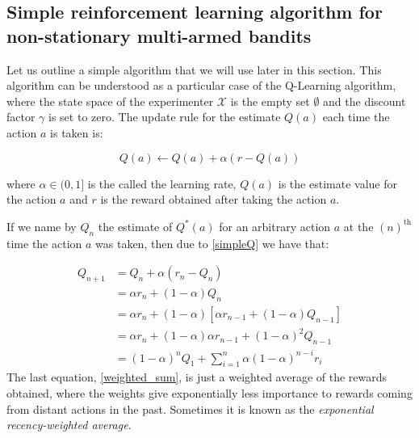 \documentclass[11pt,a4paper,twoside]{report}
\newcommand{\+}{\textnormal{+} }
\theoremstyle{definition}
\numberwithin{equation}{chapter}
\begin{document}
\subsection{Simple reinforcement learning algorithm for non-stationary
multi-armed bandits} \label{SimpleRL}

Let us outline a simple algorithm that we will use later in this section. This
algorithm can be understood as a particular case of the Q-Learning algorithm,
where the state space of the experimenter $\mathcal{X}$ is the empty set
$\emptyset$ and the discount factor $\gamma$ is set to zero. The update rule for
the estimate $Q(a)$ each time the action $a$ is taken is:

\begin{equation}
  Q(a) \leftarrow Q(a) + \alpha \left( r - Q(a) \right)
  \label{simpleQ}
\end{equation}

where $\alpha \in (0,1]$ is the called the learning rate, $Q(a)$ is the
estimate value for the action $a$ and $r$ is the reward obtained after taking
the action $a$.

If we name by $Q_n$ the estimate of $Q^*(a)$ for an arbitrary action $a$ at the
 $(n)^\text{th}$ time the action $a$ was taken, then due to \eqref{simpleQ} we
 have that:

 \begin{align}
  Q_{n+1} &=Q_{n}+\alpha\left(r_{n}-Q_{n}\right) \\
  &=\alpha r_{n}+(1-\alpha) Q_{n} \\
  &=\alpha r_{n}+(1-\alpha)\left[\alpha r_{n-1}+(1-\alpha) Q_{n-1}\right] \\
  &=\alpha r_{n}+(1-\alpha) \alpha r_{n-1}+(1-\alpha)^{2} Q_{n-1} \\
  &=(1-\alpha)^{n} Q_{1}+\sum_{i=1}^{n} \alpha(1-\alpha)^{n-i} r_{i}
  \label{weighted_sum}
  \end{align}
The last equation, \eqref{weighted_sum}, is just a weighted average of the
rewards obtained, where the weights give exponentially less importance to
rewards coming from distant actions in the past. Sometimes it is known as the
\textit{exponential recency-weighted average}.
\end{document}
